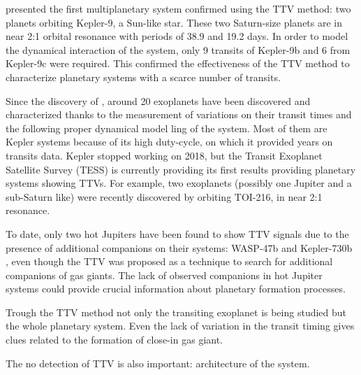 \cite{Holman2010} presented the first multiplanetary system confirmed using the TTV method: two planets orbiting Kepler-9, a Sun-like star. These two Saturn-size planets are in near 2:1 orbital resonance with periods of 38.9 and 19.2 days. In order to model the dynamical interaction of the system, only 9 transits of Kepler-9b and 6 from Kepler-9c were required. This confirmed the effectiveness of the TTV method to characterize planetary systems with a scarce number of transits.

Since the discovery of \cite{Holman2010}, around 20 exoplanets have been discovered and characterized thanks to the measurement of variations on their transit times and the following proper dynamical model ling of the system. Most of them are Kepler systems because of its high duty-cycle, on which it provided years on transits data. Kepler stopped working on 2018, but the Transit Exoplanet Satellite Survey (TESS) is currently providing its first results providing planetary systems showing TTVs.  For example, two exoplanets (possibly one Jupiter and a sub-Saturn like) were recently discovered by \cite{Dawson2019} orbiting TOI-216, in near 2:1 resonance. 

To date, only two hot Jupiters have been found to show TTV signals due to the presence of additional companions on their systems: WASP-47b \citep{Becker2015} and Kepler-730b \citep{Canas2019}, even though the TTV was proposed as a technique to search for additional companions of gas giants. The lack of observed companions in hot Jupiter systems could provide crucial information about planetary formation processes. 

Trough the TTV method not only the transiting exoplanet is being studied but the whole planetary system. Even the lack of variation in the transit timing gives clues related to the formation of close-in gas giant. 

The no detection of TTV is also important: architecture of the system.


